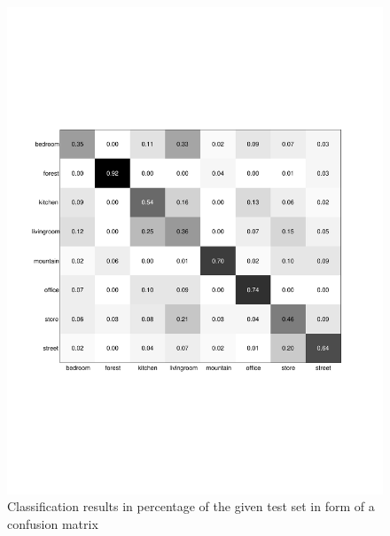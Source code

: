 \documentclass[subfigure,epsfig,fleqn,float,numbers=noenddot]{scrartcl}
\begin{document}
\begin{figure}
		\centering
		\includegraphics[width=\textwidth]{img/conf_matrix_test.pdf}
		\caption{Classification results in percentage of the given test set in form of a confusion matrix}
		\label{fig:conf_matrix_test}
\end{figure}
\end{document}
